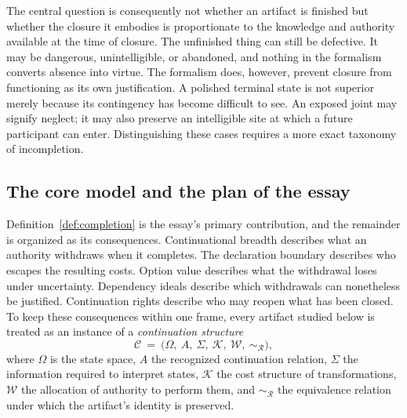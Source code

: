 The central question is consequently not whether an artifact is finished but whether the closure it embodies is proportionate to the knowledge and authority available at the time of closure. The unfinished thing can still be defective. It may be dangerous, unintelligible, or abandoned, and nothing in the formalism converts absence into virtue. The formalism does, however, prevent closure from functioning as its own justification. A polished terminal state is not superior merely because its contingency has become difficult to see. An exposed joint may signify neglect; it may also preserve an intelligible site at which a future participant can enter. Distinguishing these cases requires a more exact taxonomy of incompletion.

\subsection{The core model and the plan of the essay}

Definition~\ref{def:completion} is the essay's primary contribution, and the remainder is organized as its consequences. Continuational breadth describes what an authority withdraws when it completes. The declaration boundary describes who escapes the resulting costs. Option value describes what the withdrawal loses under uncertainty. Dependency ideals describe which withdrawals can nonetheless be justified. Continuation rights describe who may reopen what has been closed. To keep these consequences within one frame, every artifact studied below is treated as an instance of a \emph{continuation structure}
\begin{equation}\label{eq:core}
\mathcal{C}\ =\ \big(\Omega,\ A,\ \Sigma,\ \mathcal{K},\ \mathcal{W},\ \sim_{\mathcal{R}}\big),
\end{equation}
where $\Omega$ is the state space, $A$ the recognized continuation relation, $\Sigma$ the information required to interpret states, $\mathcal{K}$ the cost structure of transformations, $\mathcal{W}$ the allocation of authority to perform them, and $\sim_{\mathcal{R}}$ the equivalence relation under which the artifact's identity is preserved.

